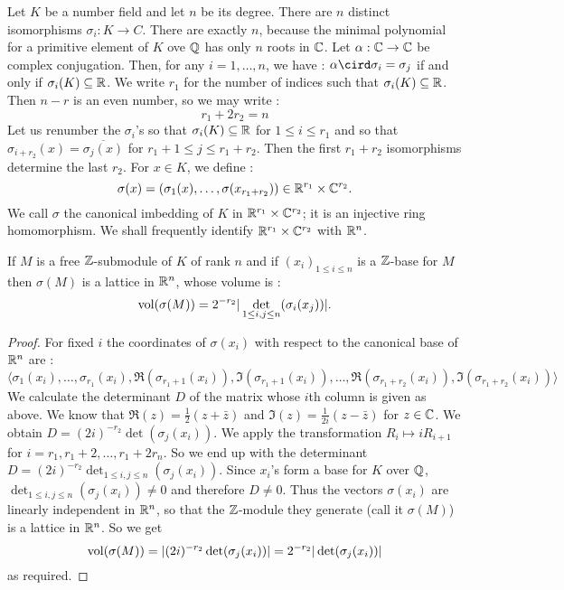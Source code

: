 \begin{definition}
  Let $K$ be a number field and let $n$ be its degree. There are $n$ distinct isomorphisms $\sigma_i : K \to C$. There are exactly $n$, because the minimal polynomial for a primitive element of $K$ ove $\mathbb{Q}$ has only $n$ roots in $\mathbb{C}$. Let $\alpha : \mathbb{C} \to \mathbb{C}$ be complex conjugation. Then, for any $i = 1, \ldots, n$, we have : $\alpha \cird \sigma_i = \sigma_j$ if and only if $\sigma_i(K)\subseteq \mathbb{R}$. We write $r_1$ for the number of indices such that
  $\sigma_i(K)\subseteq \mathbb{R}$. Then $n-r$ is an even number, so we may write :
  \[r_1 + 2 r_2 = n\]
  Let us renumber the $\sigma_i$'s so that $\sigma_i(K)\subseteq \mathbb{R}$ for $1\leq i\leq r_1$ and so that $\sigma_{i+r_2}(x)=\overline{\sigma_j(x)}$ for $r_1 + 1 \leq j \leq r_1 + r_2$. Then the first $r_1+r_2$ isomorphisms determine the last $r_2$. For $x\in K$, we define :
  \[\sigma(x)=(\sigma_1(x), \ldots, \sigma(x_{r_1+r_2}))\in \mathbb{R}^{r_1}\times \mathbb{C}^{r_2}.\]
  We call $\sigma$ the canonical imbedding of $K$ in $\mathbb{R}^{r_1}\times \mathbb{C}^{r_2}$; it is an injective ring homomorphism. We shall frequently identify $\mathbb{R}^{r_1}\times \mathbb{C}^{r_2}$ with $\mathbb{R}^{n}$.
\end{definition}

\begin{prop}
  If $M$ is a free $\mathbb{Z}$-submodule of $K$ of rank $n$ and if $(x_i)_{1\leq i\leq n}$ is a $\mathbb{Z}$-base for $M$ then $\sigma(M)$ is a lattice in $\mathbb{R}^n$, whose volume is :
  \[\operatorname{vol}(\sigma(M)) = 2^{-r_2}|\det_{1\leq i,j\leq n}(\sigma_i(x_j))|.\]
\end{prop}

\begin{proof}
  For fixed $i$ the coordinates of $\sigma(x_i)$ with respect to the canonical base of $\mathbb{R}^n$ are :
  \small{\[\langle\sigma_1(x_i),\ldots,\sigma_{r_1}(x_i), \Re(\sigma_{r_1+1}(x_i)), \Im(\sigma_{r_1+1}(x_i)),\ldots, \Re(\sigma_{r_1+r_2}(x_i)), \Im(\sigma_{r_1+r_2}(x_i))\rangle\]}
  We calculate the determinant $D$ of the matrix whose $i$th column is given as above. We know that $\Re(z) = \frac12(z+\bar{z})$ and $\Im(z)=\frac{1}{2i}(z-\bar{z})$ for $z\in \mathbb{C}$. We obtain $D = (2i)^{-r_2}\det(\sigma_j(x_i))$. We apply the transformation $R_{i}\mapsto iR_{i+1}$ for $i=r_1, r_1+2,\ldots, r_1+2r_n$.
   So we end up with the determinant $D = (2i)^{-r_2}\det_{1\leq i,j\leq n}(\sigma_j(x_i))$. Since $x_i$'s form a base for $K$ over $\mathbb{Q}$, $\det_{1\leq i,j\leq n}(\sigma_j(x_i))\neq 0$ and therefore $D\neq 0$. Thus the vectors $\sigma(x_i)$ are linearly independent in $\mathbb{R}^n$, so that the $\mathbb{Z}$-module they generate (call it $\sigma(M)$) is a lattice in $\mathbb{R}^n$. So we get
   \[\operatorname{vol}(\sigma(M)) = |(2i)^{-r_2}\det(\sigma_j(x_i))| = 2^{-r_2}|\det(\sigma_j(x_i))|\]
   as required.

\end{proof}


